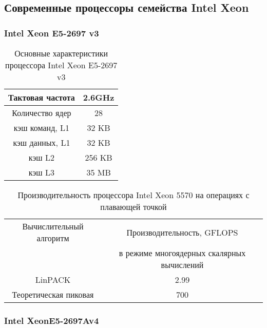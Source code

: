 \subsection{Современные процессоры семейства Intel Xeon}

\subsubsection{Intel Xeon E5-2697 v3}
\begin{table}[ht]
	\begin{center}
		\caption{Основные характеристики процессора Intel Xeon  E5-2697 v3}
		\begin{tabular}{|c|c|}
			\hline	
			Тактовая частота & 2.6GHz   \\ \hline
			Количество ядер & 28 	    \\ \hline
			кэш команд, L1 &  32 KB     \\ \hline
			кэш данных, L1 &  32 KB     \\ \hline
			кэш L2         &  256 KB    \\ \hline
			кэш L3         &  35 MB     \\ \hline
		\end{tabular}
	\end{center} 	
\end{table} 	

\begin{table}[ht]
	\begin{center}
		\caption{Производительность процессора Intel Xeon  5570 на операциях с плавающей точкой}
		\begin{tabular}{|c|c|}
			\hline	
			Вычислительный алгоритм &  Производительность, GFLOPS \\ 
			& в режиме многоядерных скалярных вычислений \\ \hline
		    LinPACK  &  2.99 	\\ \hline
			Теоретическая пиковая &  700   \\ \hline
		\end{tabular}
	\end{center} 	
\end{table} 	

\subsubsection{Intel XeonE5-2697Av4}


